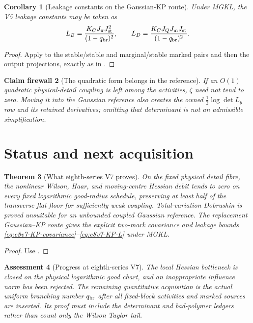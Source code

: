 \documentclass[11pt,oneside]{book}
\newtheorem{theorem}{Theorem}[chapter]
\newtheorem{corollary}[theorem]{Corollary}
\newtheorem{assessment}[theorem]{Assessment}
\newtheorem{firewall}[theorem]{Claim firewall}
\theoremstyle{definition}
\theoremstyle{remark}
\begin{document}
\begin{corollary}[Leakage constants on the Gaussian-KP route]
\label{cor:e8v7-leakage}
Under MGKL, the V5 leakage constants may be taken as
\[
 L_B=
 \frac{K_CJ_\pi J_{\rm st}^2}{(1-q_{\rm br})^2},
 \qquad
 L_D=
 \frac{K_CJ_QJ_{\rm m}J_{\rm st}}{(1-q_{\rm br})^2}. \label{eq:e8v7-KP-L}
\]
\end{corollary}

\begin{proof}
Apply  to the stable/stable and
marginal/stable marked pairs and then the output projections, exactly
as in .
\end{proof}

\begin{firewall}[The quadratic form belongs in the reference]
\label{fire:e8v7-quadratic-reference}
If an \(O(1)\) quadratic physical-detail coupling is left among the
activities, \(\zeta\) need not tend to zero.  Moving it into the
Gaussian reference also creates the owned
\(\frac12\log\det L_y\) row and its retained derivatives; omitting
that determinant is not an admissible simplification.
\end{firewall}

\section{Status and next acquisition}
\label{sec:e8v7-status}

\begin{theorem}[What eighth-series V7 proves]
\label{thm:e8v7-result}
On the fixed physical detail fibre, the nonlinear Wilson, Haar, and
moving-centre Hessian debit tends to zero on every fixed logarithmic
good-radius schedule, preserving at least half of the transverse
flat floor for sufficiently weak coupling.  Total-variation
Dobrushin is proved unsuitable for an unbounded coupled Gaussian
reference.  The replacement Gaussian--KP route gives the explicit
two-mark covariance and leakage bounds
\eqref{eq:e8v7-KP-covariance}--\eqref{eq:e8v7-KP-L} under MGKL.
\end{theorem}

\begin{proof}
Use
.
\end{proof}

\begin{assessment}[Progress at eighth-series V7]
\label{ass:e8v7-status}
The local Hessian bottleneck is closed on the physical logarithmic
good chart, and an inappropriate influence norm has been rejected.
The remaining quantitative acquisition is the actual uniform
branching number \(q_{\rm br}\) after all fixed-block activities and
marked sources are inserted.  Its proof must include the determinant
and bad-polymer ledgers rather than count only the Wilson Taylor tail.
\end{assessment}
\end{document}
